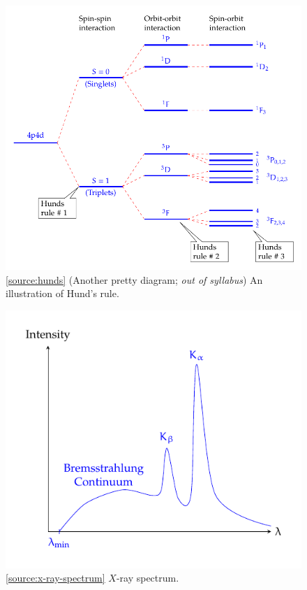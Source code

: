 \documentclass[oneside]{book}
\begin{document}
\begin{figure}[H]
    \centering
    \includegraphics[width=\textwidth]{../images/Energy level diagram(s)/energy-level-3.pdf}
    \caption{\ref{source:hunds} (Another pretty diagram; \emph{out of syllabus}) An illustration of Hund's rule.}
    \label{fig:hunds}
\end{figure} 
\vfill
\newpage
\begin{minipage}{0.6\textwidth}
    \begin{figure}[H]
        \centering
        \includegraphics[width=\textwidth]{../images/x-ray-spectrum/x-ray-spectrum.pdf}
        \caption{\ref{source:x-ray-spectrum} \(X\)-ray spectrum.}
        \label{fig:x-ray-spectrum}
    \end{figure}
\end{minipage}%
\end{document}

